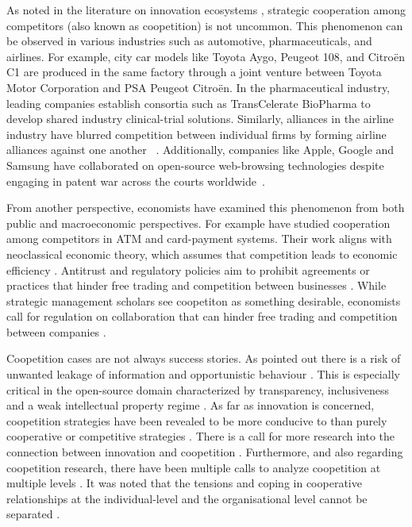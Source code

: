 \documentclass[CHICAGO,Times1COL]{WileyNJDv5} %
\begin{document}
As noted in the literature on innovation ecosystems \citep{iansiti2004strategy,clarysse_et_al_2014creating}, strategic cooperation among competitors (also known
as coopetition) is not uncommon. This phenomenon can be observed in various industries such as automotive, pharmaceuticals, and airlines. For example, city car models
like Toyota Aygo, Peugeot 108, and Citroën C1 are produced in the same factory through a joint venture between Toyota Motor Corporation and PSA Peugeot Citroën. In the
pharmaceutical industry, leading companies establish consortia such as TransCelerate BioPharma to develop shared industry clinical-trial solutions. Similarly, alliances
in the airline industry have blurred competition between individual firms by forming airline alliances against one another ~\citep{gudmundsson2006}.
Additionally, companies like
Apple, Google and Samsung have collaborated on open-source web-browsing technologies despite engaging in patent war across the courts
worldwide~\citep{TeixeiraLin2014}.


From another perspective, economists have examined this phenomenon from both public and macroeconomic perspectives. For example
\citet{schmalensee2002payment} have
studied cooperation among competitors in ATM and card-payment systems. Their work aligns with neoclassical economic theory, which assumes that competition leads to
economic efficiency \citep{lado_competition_1997}. Antitrust and regulatory policies aim to prohibit agreements or practices that hinder free trading and competition
between businesses \citep{federal2000antitrust,eu_antitrust_2011}. While strategic management scholars \citep[e.g.,][]{CzakonSrivastava_et_al2020} see coopetiton as
something desirable, economists call for regulation on collaboration that can hinder free trading and competition between companies \citep{pigou2013economics}.

Coopetition cases are not always success stories. As pointed out there is a risk of unwanted leakage of information and opportunistic behaviour \citep{Tidstrom2014}. This is especially critical in the open-source domain characterized by transparency, inclusiveness and a weak intellectual property
regime \citep{teixeiraopenness_2015}.
As far as innovation is concerned, coopetition strategies have been revealed to be more conducive to than purely cooperative or competitive strategies
\citep{QuintanaGarciaBenavidesVelasco2004}. There is a call for more research into the connection between innovation and coopetition \citep{CorboKraus_et_al2023}.
Furthermore, and also regarding coopetition research, there have been multiple calls to analyze coopetition at
multiple levels   \citep{BengtssonKock2014,TidstromRajala2016}. It was noted  that the tensions and coping in cooperative relationships at the individual-level
and the organisational level cannot be separated
 \citep{LundgrenHenrikssonTidstrom2021}.
\end{document}
